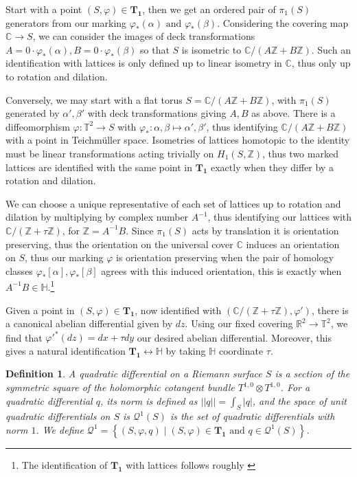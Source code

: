 \documentclass{article}
\newtheorem{defn}{Definition}
\newcommand{\set}[1]{\left\{#1\right\}}
\newcommand{\abs}[1]{\left\vert#1\right\vert}
\newcommand{\norm}[1]{\lvert\lvert#1\rvert\rvert}
\newcommand{\tand}{\text{ and }}
\begin{document}
        Start with a point \((S,\varphi) \in \mathbf{T_1}\), then we get an ordered pair of \(\pi_1(S)\) generators from our marking \(\varphi_*(\alpha) \tand \varphi_*(\beta)\). Considering the covering map \(\mathbb{C} \to S\), we can consider the images of deck transformations \(A = 0\cdot \varphi_*(\alpha), B = 0\cdot \varphi_*(\beta)\) so that \(S\) is isometric to \(\mathbb{C}/(A\mathbb{Z} + B\mathbb{Z})\). Such an identification with lattices is only defined up to linear isometry in \(\mathbb{C}\), thus only up to rotation and dilation.
        
        Conversely, we may start with a flat torus \(S = \mathbb{C}/(A\mathbb{Z} + B\mathbb{Z})\), with \(\pi_1(S)\) generated by \(\alpha',\beta'\) with deck transformations giving \(A,B\) as above. There is a diffeomorphism \(\varphi: \mathbb{T}^2 \to S\) with \(\varphi_*: \alpha,\beta \mapsto \alpha',\beta'\), thus identifying \(\mathbb{C}/(A\mathbb{Z} + B\mathbb{Z})\) with a point in Teichm\"uller space. Isometries of lattices homotopic to the identity must be linear transformations acting trivially on \(H_1(S,\mathbb{Z})\), thus two marked lattices are identified with the same point in \(\mathbf{T_1}\) exactly when they differ by a rotation and dilation.

        We can choose a unique representative of each set of lattices up to rotation and dilation by multiplying by complex number \(A^{-1}\), thus identifying our lattices with \(\mathbb{C}/(\mathbb{Z} + \tau \mathbb{Z})\), for \(\mathbb{Z} = A^{-1}B\). Since \(\pi_1(S)\) acts by translation it is orientation preserving, thus the orientation on the universal cover \(\mathbb{C}\) induces an orientation on \(S\), thus our marking \(\varphi\) is orientation preserving when the pair of homology classes \(\varphi_*[\alpha],\varphi_*[\beta]\) agrees with this induced orientation, this is exactly when \(A^{-1}B \in \mathbb{H}\).\footnote{The identification of \(\mathbf{T_1}\) with lattices follows roughly \cite{FarbMarg}}

        Given a point in \((S,\varphi) \in \mathbf{T_1}\), now identified with \((\mathbb{C}/(\mathbb{Z} + \tau \mathbb{Z}),\varphi')\), there is a canonical abelian differential given by \(dz\). Using our fixed covering \(\mathbb{R}^2 \to \mathbb{T}^2\), we find that \(\varphi'^*(dz) = dx + \tau dy\) our desired abelian differential. Moreover, this gives a natural identification \(\mathbf{T_1} \longleftrightarrow \mathbb{H}\) by taking \(\mathbb{H}\) coordinate \(\tau\).

        \begin{defn}
            A quadratic differential on a Riemann surface \(S\) is a section of the symmetric square of the holomorphic cotangent bundle \(T^{1,0} \otimes T^{1,0}\). For a quadratic differential \(q\), its norm is defined as \(\norm{q} = \int_S\abs{q}\), and the space of unit quadratic differentials on \(S\) is \(\mathcal{Q}^1(S)\) is the set of quadratic differentials with norm \(1\). We define \(\mathcal{Q}^1 = \set{(S,\varphi,q) \mid (S,\varphi) \in \mathbf{T_1} \tand q \in \mathcal{Q}^1(S)}\).
        \end{defn}
\end{document}
